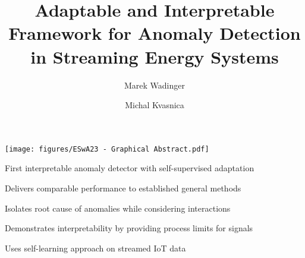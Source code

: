 \documentclass[preprint,12pt,authoryear]{elsarticle}
\begin{document}
\begin{frontmatter}


\title{Adaptable and Interpretable Framework for Anomaly Detection in Streaming Energy Systems}  %
\author[aff1]{Marek Wadinger}  %
\cortext[cor1]{}

\title{}


\author[aff1]{Michal Kvasnica}


\begin{abstract}

\end{abstract}

\begin{graphicalabstract}
    \texttt{[image: figures/ESwA23 - Graphical Abstract.pdf]}
\end{graphicalabstract}

\begin{highlights}
\item First interpretable anomaly detector with self-supervised adaptation
\item Delivers comparable performance to established general methods
\item Isolates root cause of anomalies while considering interactions
\item Demonstrates interpretability by providing process limits for signals
\item Uses self-learning approach on streamed IoT data
\end{highlights}


\end{frontmatter}
\end{document}
